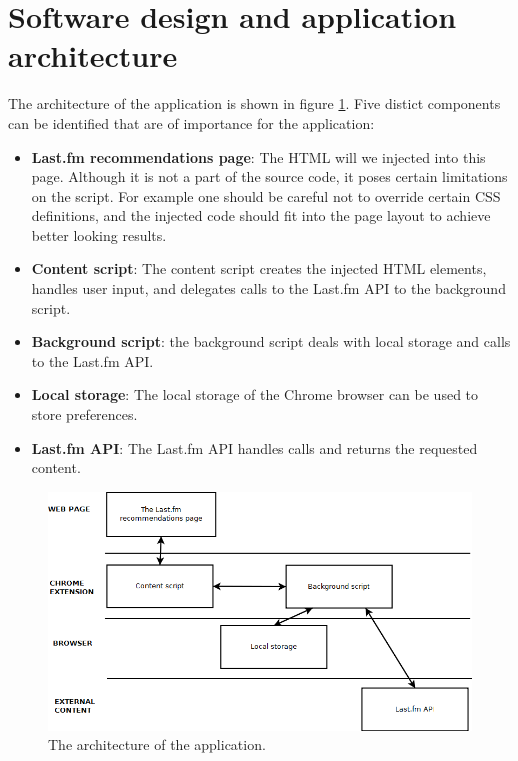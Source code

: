 \section{Software design and application architecture}\label{chapter:implementation:section:design}

The architecture of the application is shown in figure \ref{fig:architecture}. Five distict components can be identified that are of importance for the application:

\begin{itemize}
	\item \textbf{Last.fm recommendations page}: The HTML will we injected into this page. Although it is not a part of the source code, it poses certain limitations on the script. For example one should be careful not to override certain CSS definitions, and the injected code should fit into the page layout to achieve better looking results.
	\item \textbf{Content script}: The content script creates the injected HTML elements, handles user input, and delegates calls to the Last.fm API to the background script.
	\item \textbf{Background script}: the background script deals with local storage and calls to the Last.fm API.
	\item \textbf{Local storage}: The local storage of the Chrome browser can be used to store preferences.
	\item \textbf{Last.fm API}: The Last.fm API handles calls and returns the requested content.
\end{itemize}


\begin{figure}%
	\begin{center}
		\includegraphics[width=\columnwidth]{img/architecture}%
	\end{center}
	\caption{The architecture of the application.}%
	\label{fig:architecture}%
\end{figure}

